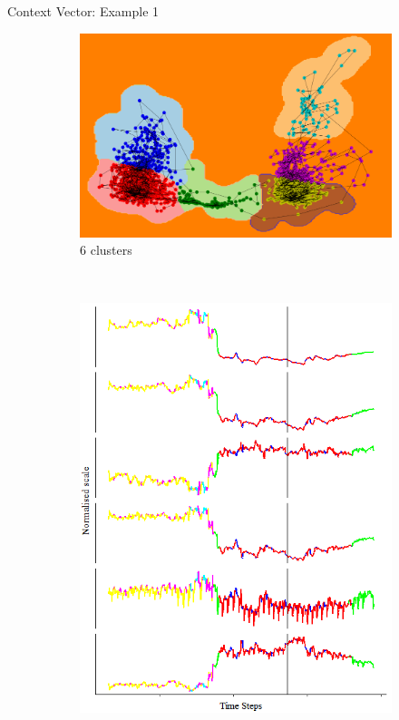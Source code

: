 \documentclass{beamer}
\begin{document}
\begin{frame}[shrink]{Context Vector: Example 1}
\begin{figure}[H]
	\begin{subfigure}[b]{0.5\textwidth}
		\includegraphics[width=\textwidth]{pca_cluster_6.png}
		\caption{\(6\) clusters}
		\label{fig:pca_cluster_6}
	\end{subfigure}
	~
	\begin{subfigure}[b]{0.25\textwidth}
		\includegraphics[width=\textwidth]{context_timeline_6.png}
		\label{fig:context_timeline_6}
	\end{subfigure}
	
\end{figure}
\end{frame}
\end{document}
